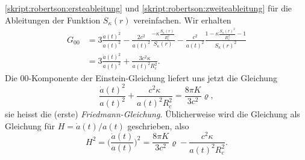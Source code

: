 \eqref{skript:robertson:ersteableitung} und
\eqref{skript:robertson:zweiteableitung} für die Ableitungen der Funktion
$S_\kappa(r)$ vereinfachen.
Wir erhalten 
\begin{align*}
G_{00}
&=
3\frac{\dot a(t)^2}{a(t)^2}
-\frac{2c^2}{a(t)^2}\frac{-\kappa\displaystyle \frac{S_\kappa(r)}{R_c^2}}{S_\kappa(r)}
-\frac{c^2}{a(t)^2}
\frac{1-\kappa \frac{\displaystyle S_\kappa(r)^2}{R_c^2}-1}{S_\kappa(r)^2}
\\
&=
3\frac{\dot a(t)^2}{a(t)^2}
+\frac{3c^2\kappa}{a(t)^2R_c^2}.
\end{align*}
Die $00$-Komponente der Einstein-Gleichung liefert uns jetzt die Gleichung
\begin{equation}
\frac{\dot a(t)^2}{a(t)^2}
+
\frac{c^2\kappa}{a(t)^2R_c^2}
=
\frac{8\pi K}{3c^2}\varrho,
\end{equation}
sie heisst die (erste) {\em Friedmann-Gleichung}.
%
Üblicherweise wird die Gleichung als Gleichung für $H=\dot a(t)/a(t)$
geschrieben, also
\begin{equation}
H^2
=
\biggl(
\frac{\dot a(t)}{a(t)}
\biggr)^2
=
\frac{8\pi K}{3c^2}\varrho
-
\frac{c^2\kappa }{a(t)^2R_c^2}.
\label{skript:friedmann:friedmann}
\end{equation}

